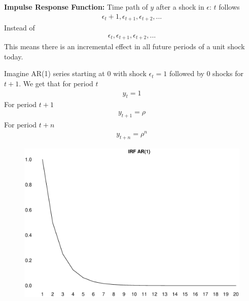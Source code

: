 \documentclass{beamer}
\begin{document}
\begin{frame}
  \textbf{Impulse Response Function:} Time path of $y$ after a shock in $\epsilon$: $t$ follows
  \begin{align}
    \epsilon_t + 1, \epsilon_{t+1}, \epsilon_{t+2},...
  \end{align}
  Instead of 
  \begin{align}
    \epsilon_t , \epsilon_{t+1}, \epsilon_{t+2},...
  \end{align}
  \medskip
  This means there is an incremental effect in all future periods of a unit shock today.  
\end{frame}

\begin{frame}
  Imagine AR(1) series starting at 0 with shock $\epsilon_t = 1$ followed by 0 shocks for $t+1$.
  We get that for period $t$
  \begin{align}
    y_t = 1
  \end{align}
  \medskip
  For period $t+1$
  \begin{align}
    y_{t+1} = \rho
  \end{align}
  \medskip 
  For period $t+n$
  \begin{align}
    y_{t+n} = \rho^n
  \end{align}
\end{frame}

\begin{frame}
  \begin{figure}
    \includegraphics[scale=.3]{irf_ar1.eps}
  \end{figure}
\end{frame}
\end{document}
